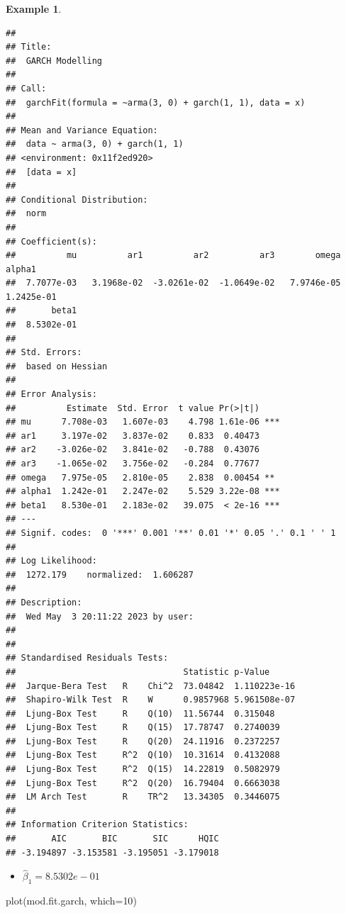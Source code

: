\documentclass[
]{book}
\newenvironment{Shaded}{\begin{snugshade}}{\end{snugshade}}
\newcommand{\AttributeTok}[1]{\textcolor[rgb]{0.77,0.63,0.00}{#1}}
\newcommand{\DecValTok}[1]{\textcolor[rgb]{0.00,0.00,0.81}{#1}}
\newcommand{\FunctionTok}[1]{\textcolor[rgb]{0.00,0.00,0.00}{#1}}
\newcommand{\NormalTok}[1]{#1}
\providecommand{\tightlist}{%
  \setlength{\itemsep}{0pt}\setlength{\parskip}{0pt}}
\theoremstyle{definition}
\theoremstyle{definition}
\newtheorem{example}{Example}[chapter]
\theoremstyle{definition}
\theoremstyle{definition}
\theoremstyle{remark}
\begin{document}
\begin{example}
\begin{verbatim}
## 
## Title:
##  GARCH Modelling 
## 
## Call:
##  garchFit(formula = ~arma(3, 0) + garch(1, 1), data = x) 
## 
## Mean and Variance Equation:
##  data ~ arma(3, 0) + garch(1, 1)
## <environment: 0x11f2ed920>
##  [data = x]
## 
## Conditional Distribution:
##  norm 
## 
## Coefficient(s):
##          mu          ar1          ar2          ar3        omega       alpha1  
##  7.7077e-03   3.1968e-02  -3.0261e-02  -1.0649e-02   7.9746e-05   1.2425e-01  
##       beta1  
##  8.5302e-01  
## 
## Std. Errors:
##  based on Hessian 
## 
## Error Analysis:
##          Estimate  Std. Error  t value Pr(>|t|)    
## mu      7.708e-03   1.607e-03    4.798 1.61e-06 ***
## ar1     3.197e-02   3.837e-02    0.833  0.40473    
## ar2    -3.026e-02   3.841e-02   -0.788  0.43076    
## ar3    -1.065e-02   3.756e-02   -0.284  0.77677    
## omega   7.975e-05   2.810e-05    2.838  0.00454 ** 
## alpha1  1.242e-01   2.247e-02    5.529 3.22e-08 ***
## beta1   8.530e-01   2.183e-02   39.075  < 2e-16 ***
## ---
## Signif. codes:  0 '***' 0.001 '**' 0.01 '*' 0.05 '.' 0.1 ' ' 1
## 
## Log Likelihood:
##  1272.179    normalized:  1.606287 
## 
## Description:
##  Wed May  3 20:11:22 2023 by user:  
## 
## 
## Standardised Residuals Tests:
##                                 Statistic p-Value     
##  Jarque-Bera Test   R    Chi^2  73.04842  1.110223e-16
##  Shapiro-Wilk Test  R    W      0.9857968 5.961508e-07
##  Ljung-Box Test     R    Q(10)  11.56744  0.315048    
##  Ljung-Box Test     R    Q(15)  17.78747  0.2740039   
##  Ljung-Box Test     R    Q(20)  24.11916  0.2372257   
##  Ljung-Box Test     R^2  Q(10)  10.31614  0.4132088   
##  Ljung-Box Test     R^2  Q(15)  14.22819  0.5082979   
##  Ljung-Box Test     R^2  Q(20)  16.79404  0.6663038   
##  LM Arch Test       R    TR^2   13.34305  0.3446075   
## 
## Information Criterion Statistics:
##       AIC       BIC       SIC      HQIC 
## -3.194897 -3.153581 -3.195051 -3.179018
\end{verbatim}

\begin{itemize}
\tightlist
\item
  \(\hat \beta_1=8.5302e-01\)
\end{itemize}

\begin{Shaded}
\begin{Highlighting}[]
\FunctionTok{plot}\NormalTok{(mod.fit.garch, }\AttributeTok{which=}\DecValTok{10}\NormalTok{)}
\end{Highlighting}
\end{Shaded}


\end{example}
\end{document}
